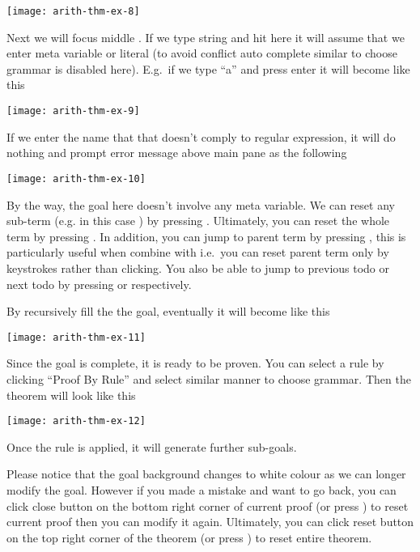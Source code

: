 \documentclass[master.tex]{subfiles}
\begin{document}
\begin{center}
\texttt{[image: arith-thm-ex-8]}
\end{center}

\hspace{1ex}

Next we will focus middle . If we type string and hit 
here it will assume that we enter meta variable or literal (to avoid conflict
auto complete similar to choose grammar is disabled here). E.g.\ if we type ``a''
and press enter it will become like this

\begin{center}
\texttt{[image: arith-thm-ex-9]}
\end{center}

If we enter the name that that doesn't comply to regular expression, it will
do nothing and prompt error message above main pane as the following

\begin{center}
\texttt{[image: arith-thm-ex-10]}
\end{center}

By the way, the goal here doesn't involve any meta variable. We can reset any
sub-term (e.g. in this case ) by pressing . Ultimately,
you can reset the whole term by pressing . In addition, you can jump
to parent term by pressing , this is particularly useful when
combine with  i.e.\ you can reset parent term only by keystrokes
rather than clicking. You also be able to jump to previous todo or next todo by
pressing  or  respectively.

By recursively fill the the goal, eventually it will become like this

\texttt{[image: arith-thm-ex-11]}

Since the goal is complete, it is ready to be proven. You can select a rule by
clicking ``Proof By Rule'' and select  similar manner to
choose grammar. Then the theorem will look like this

\texttt{[image: arith-thm-ex-12]}

\hspace{1ex}

Once the rule is applied, it will generate further sub-goals.

Please notice that the goal background changes to white colour as we can longer
modify the goal. However if you made a mistake and want to go back, you can
click close button on the bottom right corner of current proof (or press
) to reset current proof then you can modify it again. Ultimately,
you can click reset button on the top right corner of the theorem (or press
) to reset entire theorem.
\end{document}

